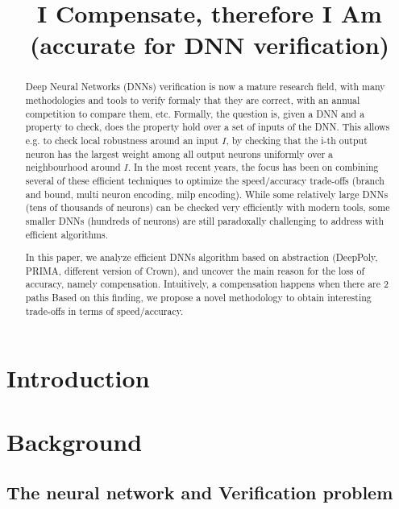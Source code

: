 \documentclass[8pt]{article}
\title{I Compensate, therefore I Am \\ (accurate for DNN verification)}
\date{}
\theoremstyle{definition}
\begin{document}
\maketitle

\begin{abstract}
  Deep Neural Networks (DNNs) verification is now a mature research field, with many methodologies and tools to verify formaly  that they are correct, with an annual competition to compare them, etc. Formally, the question is, given a DNN and a property to check, does the property hold over a set of inputs of the DNN. This allows e.g. to check local robustness around an input $I$, by checking that the i-th output neuron has the largest weight among all output neurons uniformly over a neighbourhood around $I$.
  In the most recent years, the focus has been on combining several of these efficient techniques to optimize the speed/accuracy trade-offs (branch and bound, multi neuron encoding, milp encoding). While some relatively large DNNs (tens of thousands of neurons) can be checked very efficiently with modern tools, 
  some smaller DNNs (hundreds of neurons) are still paradoxally challenging to address with efficient algorithms.

  In this paper, we analyze efficient DNNs algorithm based on abstraction (DeepPoly, PRIMA, different version of Crown), and uncover the main reason for the loss of accuracy, namely compensation. Intuitively, a compensation happens when there are 2 paths 
   Based on this finding, we propose a novel methodology to obtain interesting trade-offs in terms of speed/accuracy.
\end{abstract}	


\section{Introduction}

\section{Background}

\subsection{The neural network and Verification problem}

\end{document}
